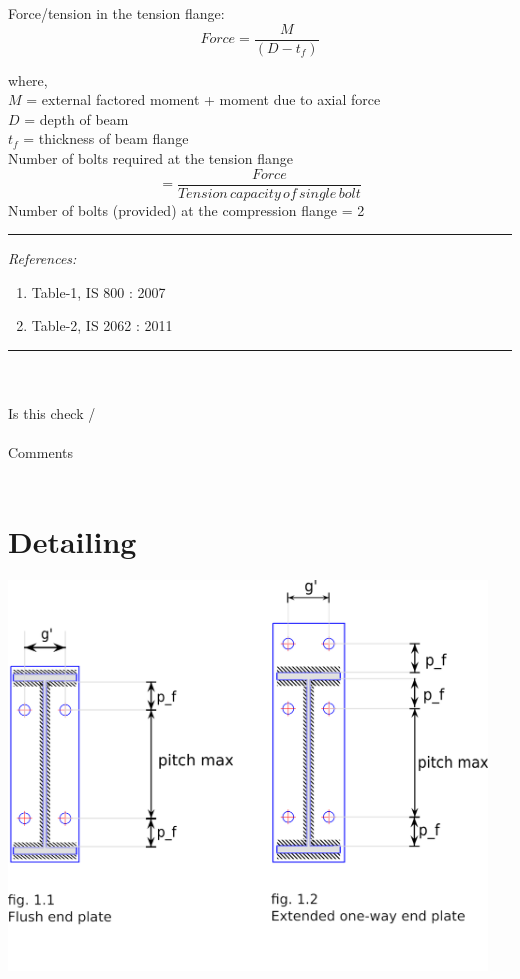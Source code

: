 \documentclass[11.5pt,a4paper,oneside]{report}
\newcommand{\okornot}{ \vspace{15mm} \hrule
	\noindent \\ \\
	Is this check \qquad
	\CheckBox[checked=False, name= ok]{\textbf{Ok}} \qquad / 
	\CheckBox[checked=False, name= notok]{\textbf{Not Ok}}\\ \\
	Comments \\ \\
	\noindent
	\TextField[name=multilinetextbox, multiline=true, width=1.0\linewidth,height=2in]{}}
\newcommand{\checkrefernces} {
	\vspace{15mm} \hrule \vspace{2mm}
	\textit{References:}}
\begin{document}
\begin{Form}
	\vspace{5mm}
					
	Force/tension in the tension flange:
		\begin{equation}
			\boxed{Force = \frac{M}{(D - t_{f})}}
		\end{equation}
		
			where, \\
			$M$ = external factored moment + moment due to axial force \\
			$D$ = depth of beam \\
			$t_{f}$ = thickness of beam flange \\
			
			Number of bolts required at the tension flange
			\begin{equation}
				\boxed{= \frac{Force}{Tension \, capacity\, of\, single\, bolt}} 
			\end{equation}
			Number of bolts (provided) at the compression flange = 2
			
		\checkrefernces
			\begin{enumerate}
				\item Table-1, IS 800 : 2007
				\item Table-2, IS 2062 : 2011
			\end{enumerate}
		\okornot
		

\chapter{Detailing}
		
		{\centering
		\includegraphics[width=5in]{svg_drawingFPEOW.png} \\}
		

\end{Form}
\end{document}
